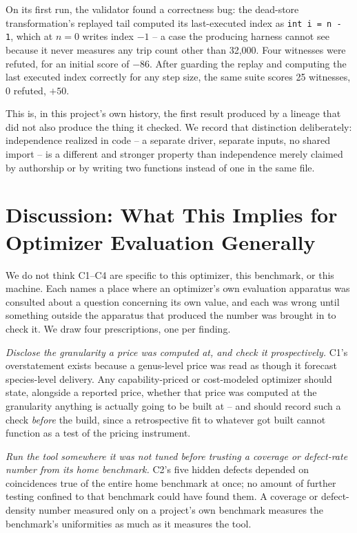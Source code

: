\documentclass[sigconf,review,anonymous]{acmart}
\begin{document}
On its first run, the validator found a correctness bug: the dead-store
transformation's replayed tail computed its last-executed index as
\texttt{int i = n - 1}, which at $n=0$ writes index $-1$ -- a case the
producing harness cannot see because it never measures any trip count other
than 32{,}000. Four witnesses were refuted, for an initial score of $-86$.
After guarding the replay and computing the last executed index correctly
for any step size, the same suite scores 25 witnesses, 0 refuted, $+50$.

This is, in this project's own history, the first result produced by a
lineage that did not also produce the thing it checked. We record that
distinction deliberately: independence realized in code -- a separate
driver, separate inputs, no shared import -- is a different and stronger
property than independence merely claimed by authorship or by writing two
functions instead of one in the same file.

\section{Discussion: What This Implies for Optimizer Evaluation Generally}
\label{sec:discussion}

We do not think C1--C4 are specific to this optimizer, this benchmark, or
this machine. Each names a place where an optimizer's own evaluation
apparatus was consulted about a question concerning its own value, and each
was wrong until something outside the apparatus that produced the number
was brought in to check it. We draw four prescriptions, one per finding.

\emph{Disclose the granularity a price was computed at, and check it
prospectively.} C1's overstatement exists because a genus-level price was
read as though it forecast species-level delivery. Any capability-priced or
cost-modeled optimizer should state, alongside a reported price, whether
that price was computed at the granularity anything is actually going to be
built at -- and should record such a check \emph{before} the build, since a
retrospective fit to whatever got built cannot function as a test of the
pricing instrument.

\emph{Run the tool somewhere it was not tuned before trusting a coverage or
defect-rate number from its home benchmark.} C2's five hidden defects
depended on coincidences true of the entire home benchmark at once; no
amount of further testing confined to that benchmark could have found them.
A coverage or defect-density number measured only on a project's own
benchmark measures the benchmark's uniformities as much as it measures the
tool.
\end{document}
